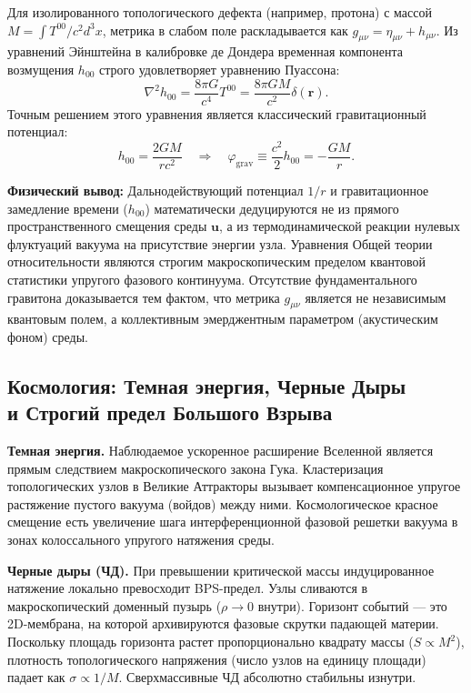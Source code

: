 \documentclass[11pt,a4paper]{article}
\begin{document}
	Для изолированного топологического дефекта (например, протона) с массой $M = \int T^{00}/c^2 d^3x$, метрика в слабом поле раскладывается как $g_{\mu\nu} = \eta_{\mu\nu} + h_{\mu\nu}$. Из уравнений Эйнштейна в калибровке де Дондера временная компонента возмущения $h_{00}$ строго удовлетворяет уравнению Пуассона:
	\begin{equation}
		\nabla^2 h_{00} = \frac{8\pi G}{c^4} T^{00} = \frac{8\pi G M}{c^2} \delta(\mathbf{r}).
	\end{equation}
	Точным решением этого уравнения является классический гравитационный потенциал:
	\begin{equation}
		h_{00} = \frac{2 G M}{r c^2} \quad \Longrightarrow \quad \varphi_{\text{grav}} \equiv \frac{c^2}{2} h_{00} = - \frac{GM}{r}.
	\end{equation}
	
	\textbf{Физический вывод:} Дальнодействующий потенциал $1/r$ и гравитационное замедление времени ($h_{00}$) математически дедуцируются не из прямого пространственного смещения среды $\mathbf{u}$, а из термодинамической реакции нулевых флуктуаций вакуума на присутствие энергии узла. Уравнения Общей теории относительности являются строгим макроскопическим пределом квантовой статистики упругого фазового континуума. Отсутствие фундаментального гравитона доказывается тем фактом, что метрика $g_{\mu\nu}$ является не независимым квантовым полем, а коллективным эмерджентным параметром (акустическим фоном) среды.
	
	\subsection{Космология: Темная энергия, Черные Дыры\\ и Строгий предел Большого Взрыва}
	\textbf{Темная энергия.} Наблюдаемое ускоренное расширение Вселенной является прямым следствием макроскопического закона Гука. Кластеризация топологических узлов в Великие Аттракторы вызывает компенсационное упругое растяжение пустого вакуума (войдов) между ними. Космологическое красное смещение есть увеличение шага интерференционной фазовой решетки вакуума в зонах колоссального упругого натяжения среды.
	
	\textbf{Черные дыры (ЧД).} При превышении критической массы индуцированное натяжение локально превосходит BPS-предел. Узлы сливаются в макроскопический доменный пузырь ($\rho \to 0$ внутри). Горизонт событий — это 2D-мембрана, на которой архивируются фазовые скрутки падающей материи. Поскольку площадь горизонта растет пропорционально квадрату массы ($S \propto M^2$), плотность топологического напряжения (число узлов на единицу площади) падает как $\sigma \propto 1/M$. Сверхмассивные ЧД абсолютно стабильны изнутри.
	
\end{document}
